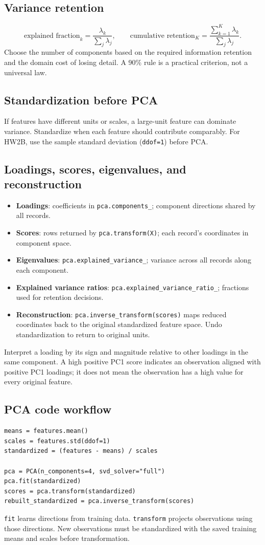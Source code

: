 \documentclass[11pt]{article}
\begin{document}
\subsection{Variance retention}
\[
\text{explained fraction}_k=\frac{\lambda_k}{\sum_j\lambda_j},
\qquad
\text{cumulative retention}_K=\frac{\sum_{k=1}^{K}\lambda_k}{\sum_j\lambda_j}.
\]
Choose the number of components based on the required information retention and the domain cost of losing detail. A 90\% rule is a practical criterion, not a universal law.

\subsection{Standardization before PCA}
If features have different units or scales, a large-unit feature can dominate variance. Standardize when each feature should contribute comparably. For HW2B, use the sample standard deviation (\texttt{ddof=1}) before PCA.

\subsection{Loadings, scores, eigenvalues, and reconstruction}
\begin{itemize}
	\item \textbf{Loadings}: coefficients in \texttt{pca.components\_}; component directions shared by all records.
	\item \textbf{Scores}: rows returned by \texttt{pca.transform(X)}; each record's coordinates in component space.
	\item \textbf{Eigenvalues}: \texttt{pca.explained\_variance\_}; variance across all records along each component.
	\item \textbf{Explained variance ratios}: \texttt{pca.explained\_variance\_ratio\_}; fractions used for retention decisions.
	\item \textbf{Reconstruction}: \texttt{pca.inverse\_transform(scores)} maps reduced coordinates back to the original standardized feature space. Undo standardization to return to original units.
\end{itemize}
Interpret a loading by its sign and magnitude relative to other loadings in the same component. A high positive PC1 score indicates an observation aligned with positive PC1 loadings; it does not mean the observation has a high value for every original feature.

\subsection{PCA code workflow}
\begin{lstlisting}
means = features.mean()
scales = features.std(ddof=1)
standardized = (features - means) / scales

pca = PCA(n_components=4, svd_solver="full")
pca.fit(standardized)
scores = pca.transform(standardized)
rebuilt_standardized = pca.inverse_transform(scores)
\end{lstlisting}
\texttt{fit} learns directions from training data. \texttt{transform} projects observations using those directions. New observations must be standardized with the saved training means and scales before transformation.
\end{document}
